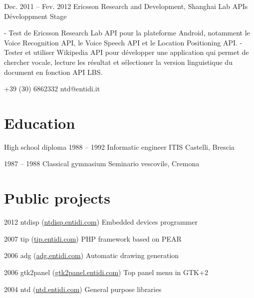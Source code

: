 \documentclass{tccv}
\begin{document}
\begin{eventlist}
\item{Dec. 2011 -- Fev. 2012}
     {Ericsson Research and Development, Shanghai}
     {Lab APIs Développment Stage}

- Test de Ericsson Research Lab API pour la plateforme Android, notamment le Voice Recognition API, le Voice Speech API et le Location Positioning API.
\newline
- Tester et utiliser Wikipedia API pour développer une application qui permet de chercher vocale, lecture les résultat et sélectioner la version linguistique du document en fonction API LBS.

\end{eventlist}

    {+39 (30) 6862332}
    {ntd@entidi.it}

\section{Education}

\begin{yearlist}

\item[High school diploma]{1988 -- 1992}
     {Informatic engineer}
     {ITIS Castelli, Brescia}

\item{1987 -- 1988}
     {Classical gymnasium}
     {Seminario vescovile, Cremona}

\end{yearlist}

\section{Public projects}

\begin{yearlist}

\item{2012}
     {ntdisp (\href{http://ntdisp.entidi.com/}{ntdisp.entidi.com})}
     {Embedded devices programmer}

\item{2007}
     {tip (\href{http://tip.entidi.com/}{tip.entidi.com})}
     {PHP framework based on PEAR}

\item{2006}
     {adg (\href{http://adg.entidi.com/}{adg.entidi.com})}
     {Automatic drawing generation}

\item{2006}
     {gtk2panel (\href{http://gtk2panel.entidi.com/}{gtk2panel.entidi.com})}
     {Top panel menu in GTK+2}

\item{2004}
     {ntd (\href{http://ntd.entidi.com/}{ntd.entidi.com})}
     {General purpose libraries}

\end{yearlist}
\end{document}

